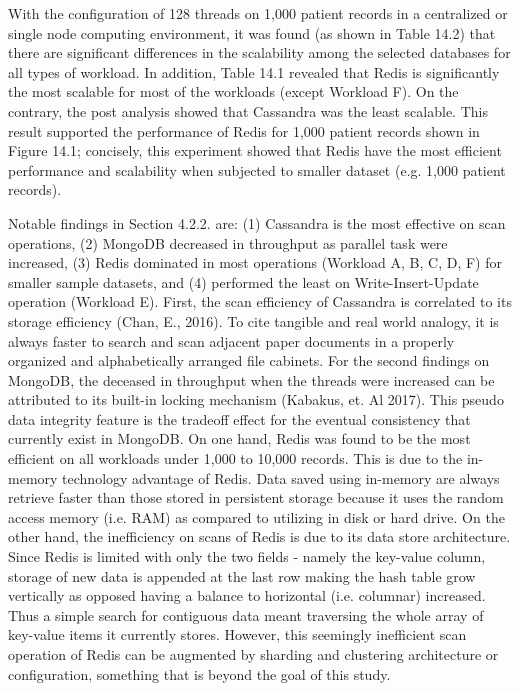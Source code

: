 \documentclass[5p]{elsarticle}
\begin{document}
With the configuration of 128 threads on 1,000 patient records in a centralized or single node computing environment, 
it was found (as shown in Table 14.2) that there are significant differences in the scalability among the selected databases for all types of workload.
In addition, Table 14.1 revealed that Redis is significantly the most scalable for most of the workloads (except Workload F). 
On the contrary, the post analysis showed that Cassandra was the least scalable. 
This result supported the performance of Redis for 1,000 patient records shown in Figure 14.1; 
concisely, this experiment showed that Redis have the most efficient performance and scalability when subjected to smaller dataset (e.g. 1,000 patient records). 

													
Notable findings in Section 4.2.2. are: (1) Cassandra is the most effective on scan operations, (2) MongoDB decreased in throughput as parallel task were increased, (3) Redis dominated in most operations (Workload A, B, C, D, F) for smaller sample datasets, and (4) performed the least on Write-Insert-Update operation (Workload E). 
First, the scan efficiency of Cassandra is correlated to its storage efficiency (Chan, E., 2016). To cite tangible and real world analogy, it is always faster to search and scan adjacent paper documents in a properly organized and alphabetically arranged file cabinets. For the second findings on MongoDB, the deceased in throughput when the threads were increased can be attributed to its built-in locking mechanism (Kabakus, et. Al 2017). This pseudo data integrity feature is the tradeoff effect for the eventual consistency that currently exist in MongoDB. 
On one hand, Redis was found to be the most efficient on all workloads under 1,000 to 10,000 records. This is due to the in-memory technology advantage of Redis. Data saved using in-memory are always retrieve faster than those stored in persistent storage because it uses the random access memory (i.e. RAM) as compared to utilizing in disk or hard drive. On the other hand, the inefficiency on scans of Redis is due to its data store architecture. Since Redis is limited with only the two fields - namely the key-value column, storage of new data is appended at the last row making the hash table grow vertically as opposed having a balance to horizontal (i.e. columnar) increased. Thus a simple search for contiguous data meant traversing the whole array of key-value items it currently stores. However, this seemingly inefficient scan operation of Redis can be augmented by sharding and clustering architecture or configuration, something that is beyond the goal of this study.
\end{document}
